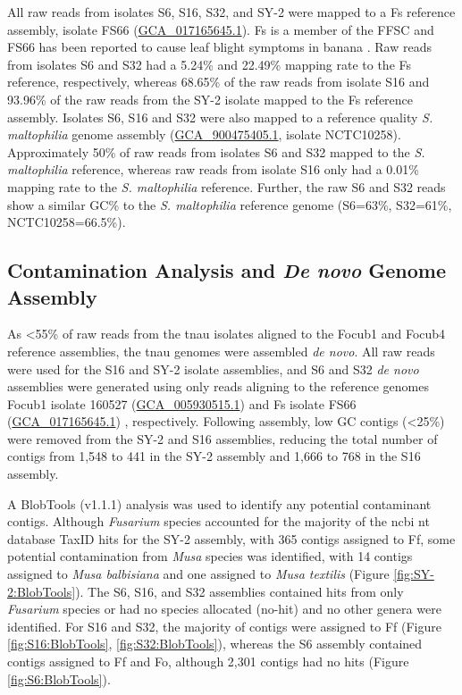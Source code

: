 All raw reads from isolates S6, S16, S32, and SY-2 were mapped to a \acf{Fs} reference assembly, isolate FS66 (\href{https://www.ncbi.nlm.nih.gov/datasets/genome/GCA_017165645.1/}{GCA\_017165645.1}). \ac{Fs} is a member of the \ac{FFSC} and FS66 has been reported to cause leaf blight symptoms in banana \parencite{Cui2021}. Raw reads from isolates S6 and S32 had a 5.24\% and 22.49\% mapping rate to the \ac{Fs} reference, respectively, whereas 68.65\% of the raw reads from isolate S16 and 93.96\% of the raw reads from the SY-2 isolate mapped to the \ac{Fs} reference assembly. Isolates S6, S16 and S32 were also mapped to a reference quality \textit{S. maltophilia} genome assembly (\href{https://www.ncbi.nlm.nih.gov/datasets/genome/GCF_900475405.1/}{GCA\_900475405.1}, isolate NCTC10258). Approximately 50\% of raw reads from isolates S6 and S32 mapped to the \textit{S. maltophilia} reference, whereas raw reads from isolate S16 only had a 0.01\% mapping rate to the \textit{S. maltophilia} reference. Further, the raw S6 and S32 reads show a similar GC\% to the \textit{S. maltophilia} reference genome (S6=63\%, S32=61\%, NCTC10258=66.5\%).

\bigskip


\subsection{Contamination Analysis and \textit{De novo} Genome Assembly}

As <55\% of raw reads from the \ac{tnau} isolates aligned to the \ac{Focub1} and \ac{Focub4} reference assemblies, the \ac{tnau} genomes were assembled \textit{de novo}. All raw reads were used for the S16 and SY-2 isolate  assemblies, and S6 and S32 \textit{de novo} assemblies were generated using only reads aligning to the reference genomes \ac{Focub1} isolate 160527 (\href{https://www.ncbi.nlm.nih.gov/datasets/genome/GCA_005930515.1/}{GCA\_005930515.1}) \parencite{Asai2019} and \ac{Fs} isolate FS66 (\href{https://www.ncbi.nlm.nih.gov/datasets/genome/GCA_017165645.1/}{GCA\_017165645.1}) \parencite{Cui2021}, respectively. Following assembly, low GC contigs  (\textless 25\%) were removed from the SY-2 and S16 assemblies, reducing the total number of contigs from 1,548 to 441 in the SY-2 assembly and 1,666 to 768 in the S16 assembly.  

A BlobTools (v1.1.1) analysis was used to identify any potential contaminant contigs. Although \textit{Fusarium} species  accounted for the majority of the \ac{ncbi} nt database TaxID hits for the SY-2 assembly, with 365 contigs  assigned to \ac{Ff}, some potential contamination from \textit{Musa} species was identified, with 14 contigs assigned to \textit{Musa balbisiana} and one assigned to \textit{Musa textilis} (Figure \ref{fig:SY-2:BlobTools}). The S6, S16, and S32 assemblies contained hits from only \textit{Fusarium} species or had no species allocated (no-hit) and no other genera were identified. For S16 and S32, the majority of contigs were assigned to \ac{Ff} (Figure \ref{fig:S16:BlobTools}, \ref{fig:S32:BlobTools}), whereas the  S6 assembly contained contigs assigned to \ac{Ff} and \ac{Fo}, although 2,301 contigs had no hits (Figure \ref{fig:S6:BlobTools}).  

